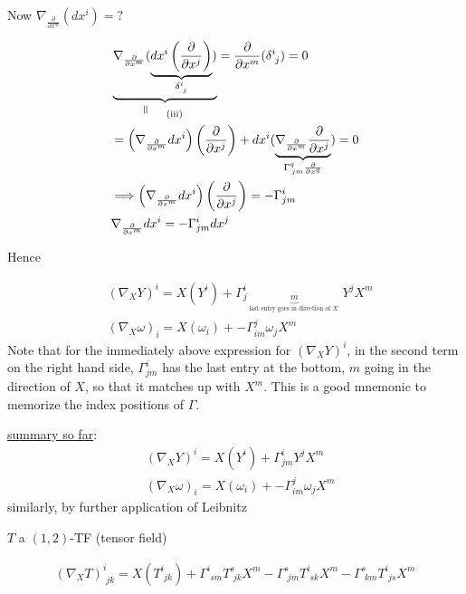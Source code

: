 \documentclass[10pt, twoside]{amsart}
\begin{document}
\begin{multicols*}{2}
Now $\nabla_{ \frac{ \partial }{ \partial x^m}  }(dx^i) = ?$

\[
\begin{aligned}
  & \underbrace{ \nabla_{  \frac{ \partial }{ \partial x^m} } ( \underbrace{ dx^i \left( \frac{ \partial }{ \partial x^j } \right) }_{ \delta^i_{ \, \, j} } ) }_{ \rotatebox{90}{$\,=$} \quad \, \text{ (iii) } }  = \frac{ \partial }{ \partial x^m} ( \delta^i_{ \, \, j} ) = 0  \\
& = \left( \nabla_{ \frac{ \partial }{ \partial x^m} } dx^i \right)\left( \frac{ \partial }{ \partial x^j} \right) + dx^i (   \underbrace{ \nabla_{ \frac{ \partial }{ \partial x^m } } \frac{ \partial }{ \partial x^j } }_{ \Gamma^q_{ \, jm }\frac{ \partial }{ \partial x^q} }   ) = 0 \\
& \Longrightarrow \left( \nabla_{ \frac{ \partial }{ \partial x^m } } dx^i \right)\left( \frac{ \partial }{ \partial x^j } \right) = - \Gamma^i_{ jm} \\
& \nabla_{ \frac{ \partial }{ \partial x^m} } dx^i = -\Gamma^i_{ jm} dx^j 
\end{aligned}
\]



Hence

\[
\begin{aligned}
  & ( \nabla_X Y)^i = X(Y^i) + \Gamma^i_{j\underbrace{m}_{\text{ last entry goes in direction of $X$ }} } Y^j X^m \\
  & (\nabla_X \omega)_i = X(\omega_i) + - \Gamma^j_{im} \omega_j X^m
\end{aligned}
\]
Note that for the immediately above expression for $(\nabla_X Y)^i$, in the second term on the right hand side, $\Gamma_{jm}^i$ has the last entry at the bottom, $m$ going in the direction of $X$, so that it matches up with $X^m$. This is a good mnemonic to memorize the index positions of $\Gamma$. 

\underline{summary so far}:
\[
\begin{aligned}
  & ( \nabla_X Y)^i = X(Y^i) + \Gamma^i_{jm }  Y^j X^m \\
  & (\nabla_X \omega)_i = X(\omega_i) + - \Gamma^j_{im} \omega_j X^m
\end{aligned}
\]
similarly, by further application of Leibnitz

$T$ a $(1,2)$-TF (tensor field)

\[
\begin{aligned}
  (\nabla_X T)^i_{ \, \, jk } = X(T^i_{ \, \, jk} ) + \Gamma^i_{ \, \, s m } T^s_{ \, \, jk} X^m - \Gamma^s_{ \, \, jm} T^i_{ \, \, sk} X^m - \Gamma^s_{ \, \, km} T^i_{ \,\, js} X^m
\end{aligned}
\]


\end{multicols*}
\end{document}
